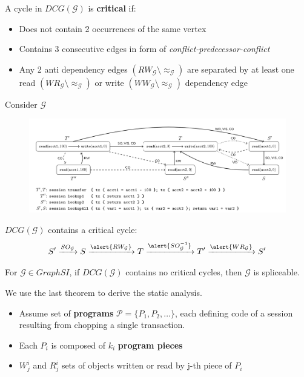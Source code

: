 \documentclass{beamer}
\begin{document}
\begin{frame}
	\begin{definition}
		A cycle in $DCG(\mathcal{G})$ is \textbf{critical} if:
		\begin{itemize}
			\item Does not contain 2 occurrences of the same vertex 
			\item Contains 3 consecutive edges in form of \textsl{conflict-predecessor-conflict}
			\item Any 2 anti dependency edges $(RW_\mathcal{G}\setminus \approx_\mathcal{G})$ are separated by at least one read $(WR_\mathcal{G}\setminus \approx_\mathcal{G})$ or write $(WW_\mathcal{G}\setminus \approx_\mathcal{G})$ dependency edge
		\end{itemize}
	\end{definition}
\end{frame}


\begin{frame}
	Consider $\mathcal{G}$
	\begin{figure}
		\includegraphics[scale=0.25]{fig4}
	\end{figure}
	\begin{example}
		$DCG(\mathcal{G})$ contains a critical cycle:
		$$  
			S^\prime \xrightarrow{SO_\mathcal{G}}
			S \xrightarrow{\alert{RW_\mathcal{G}}} 
			T \xrightarrow{\alert{SO^{-1}_\mathcal{G}}} 
			T^\prime \xrightarrow{\alert{WR_\mathcal{G}}} 
			S^\prime
		$$
	\end{example}
\end{frame}


\begin{frame}
	\begin{theorem}
		For $\mathcal{G} \in GraphSI$, if $DCG(\mathcal{G})$ contains no critical cycles, then $\mathcal{G}$ is spliceable.
	\end{theorem}
\end{frame}


\begin{frame}
We use the last theorem to derive the static analysis.
\begin{itemize}
	\item Assume set of \textbf{programs} $\mathcal{P}=\{P_1, P_2, \dots\}$, each defining code of a session resulting from chopping a single transaction.
	\item Each $P_i$ is composed of $k_i$ \textbf{program pieces}
	\item $W^i_j$ and $R^i_j$ sets of objects written or read by j-th piece of $P_i$ 
\end{itemize}
\end{frame}
\end{document}

